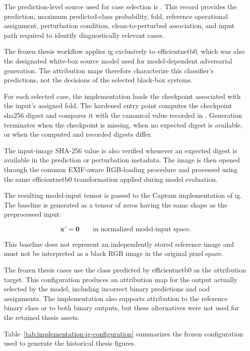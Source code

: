 The prediction-level source used for case selection is
. This record
provides the prediction, maximum predicted-class probability, fold, reference
operational assignment, perturbation condition, clean-to-perturbed association,
and input path required to identify diagnostically relevant cases.

The frozen thesis workflow applies \gls{ig} exclusively to \gls{efficientnetb0},
which was also the designated white-box source model used for model-dependent
adversarial generation. The attribution maps therefore characterize this
classifier's predictions, not the decisions of the selected black-box systems.

For each selected case, the implementation loads the checkpoint associated with
the input's assigned fold. The hardened entry point computes the checkpoint
\gls{sha256} digest and compares it with the canonical value recorded in
. Generation terminates when the
checkpoint is missing, when no expected digest is available, or when the
computed and recorded digests differ.

The input-image SHA-256 value is also verified whenever an expected digest is
available in the prediction or perturbation metadata. The image is then opened
through the common EXIF-aware RGB-loading procedure and processed using the
same \gls{efficientnetb0} transformation applied during model evaluation.

The resulting model-input tensor is passed to the Captum implementation of
\gls{ig}. The baseline is generated as a tensor of zeros having the same shape
as the preprocessed input:

\[
\mathbf{x}'
=
\mathbf{0}
\qquad
\text{in normalized model-input space}.
\]

This baseline does not represent an independently stored reference image and
must not be interpreted as a black RGB image in the original pixel space.

The frozen thesis cases use the class predicted by \gls{efficientnetb0} as the attribution
target. This configuration produces an attribution map for the output actually
selected by the model, including incorrect binary predictions and
\gls{ood} assignments. The implementation also supports attribution to the
reference binary class or to both binary outputs, but these alternatives were
not used for the retained thesis assets.

Table~\ref{tab:implementation-ig-configuration} summarizes the frozen
configuration used to generate the historical thesis figures.


